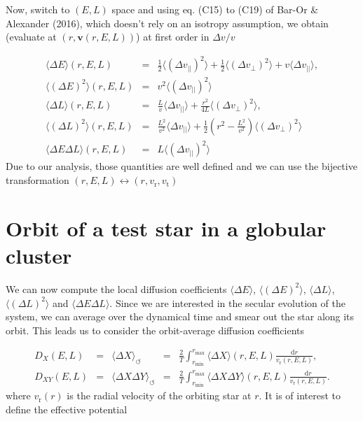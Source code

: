 \documentclass[11pt]{article}
\newcommand{\rt}{\mathrm{t}}
\newcommand{\rr}{\mathrm{r}}
\newcommand{\vr}{v_{\rr}}
\newcommand{\vt}{v_{\rt}}
\newcommand{\bv}{\boldsymbol{v}}
\newcommand{\dvPar}{\Delta v_{||}}
\newcommand{\dvPerp}{\Delta v_{\perp}}
\newcommand{\dvParAvrLoc}{\langle \dvPar \rangle}
\newcommand{\dvParSqAvrLoc}{\langle(\dvPar)^{2}\rangle}
\newcommand{\dvPerpSqAvrLoc}{\langle(\dvPerp)^{2}\rangle}
\newcommand{\rd}{{\mathrm{d}}}
\newcommand{\Dv}{\Delta v}
\newcommand{\DE}{\Delta E}
\newcommand{\DL}{\Delta L}
\newcommand{\DEAvr}{\langle\DE\rangle}
\newcommand{\DESqAvr}{\langle (\DE)^{2} \rangle}
\newcommand{\DLAvr}{\langle\DL\rangle}
\newcommand{\DLSqAvr}{\langle (\DL)^{2} \rangle}
\newcommand{\DEDLAvr}{\langle \DE \DL \rangle}
\newcommand{\DXAvr}{\langle\Delta X\rangle}
\newcommand{\DXYAvr}{\langle\Delta X \Delta Y\rangle}
\newcommand{\dX}{D_{X}}
\newcommand{\dXY}{D_{XY}}
\newcommand{\rmax}{r_{\max}}
\newcommand{\rmin}{r_{\min}}
\begin{document}
Now, switch to $(E,L)$ space and using eq. (C15) to (C19) of Bar-Or
\& Alexander (2016), which doesn't rely on an isotropy assumption,
we obtain (evaluate at $(r,\bv(r,E,L))$) at first order
in $\Dv/v$

\begin{equation}
\begin{array}{ccl}
 \DEAvr(r,E,L) & =&\displaystyle{\frac{1}{2}\dvParSqAvrLoc+\frac{1}{2}\dvPerpSqAvrLoc+v\dvParAvrLoc} ,\\
  
 \DESqAvr(r,E,L) & = &\displaystyle{v^{2}\dvParSqAvrLoc}\\
  \DLAvr(r,E,L) & =&\displaystyle{\frac{L}{v}\dvParAvrLoc+\frac{r^{2}}{4L}\dvPerpSqAvrLoc} ,\\
  
  \DLSqAvr(r,E,L) & = &\displaystyle{\frac{L^{2}}{v^{2}}\dvParAvrLoc+\frac{1}{2}\left(r^{2}-\frac{L^{2}}{v^{2}}\right)\dvPerpSqAvrLoc}\\
  
  \DEDLAvr(r,E,L) & = &\displaystyle{L \dvParSqAvrLoc}   
\end{array}
\label{eq:DE_DL}
\end{equation}
Due to our analysis, those quantities are well defined and
we can use the bijective transformation $(r,E,L)\leftrightarrow(r,\vr,\vt)$

\section{Orbit of a test star in a globular cluster}
\label{sec:Orbit_globular_cluster}

We can now compute the local diffusion coefficients $\DEAvr$,
$\DESqAvr$, $\DLAvr$,
$\DLSqAvr$ and $\DEDLAvr$.
Since we are interested in the secular evolution of the system, we
can average over the dynamical time and smear out the star along its
orbit. This leads us to consider the orbit-average diffusion coefficients

\begin{equation}
\begin{array}{cclcl}
 \dX(E,L) & =& \DXAvr_{\leftturn} & =&\displaystyle{\frac{2}{T}\int_{\rmin}^{\rmax}\DXAvr(r,E,L)\frac{{\rd}r}{\vr(r,E,L)}} ,\\
  
  \dXY(E,L) & =& \DXYAvr_{\leftturn} & =&\displaystyle{\frac{2}{T}\int_{\rmin}^{\rmax}\DXYAvr(r,E,L)\frac{{\rd}r}{\vr(r,E,L)}} .
\end{array}
\label{eq:DE_DL}
\end{equation}
where $\vr(r)$ is the radial velocity of the orbiting star at $r$. It is of interest to define the effective potential
\end{document}
